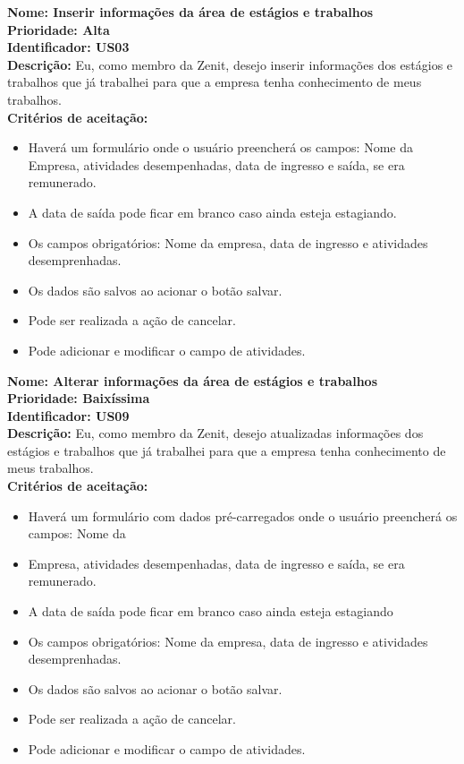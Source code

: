 \begin{anexosenv}
\textbf{Nome: Inserir informações da área de estágios e trabalhos\\
    Prioridade: Alta\\
    Identificador: US03\\
    Descrição:} Eu, como membro da Zenit, desejo inserir informações dos estágios e trabalhos que já trabalhei para que a empresa tenha conhecimento de meus trabalhos.\\
\textbf{Critérios de aceitação:}
\begin{itemize}
    \item Haverá um formulário onde o usuário preencherá os campos: Nome da Empresa, atividades desempenhadas, data de ingresso e saída, se era remunerado.
    \item A data de saída pode ficar em branco caso ainda esteja estagiando.
    \item Os campos obrigatórios: Nome da empresa, data de ingresso e atividades desemprenhadas.
    \item Os dados são salvos ao acionar o botão salvar.
    \item Pode ser realizada a ação de cancelar.
    \item Pode adicionar e modificar o campo de atividades.
\end{itemize}

\textbf{Nome: Alterar informações da área de estágios e trabalhos\\
    Prioridade: Baixíssima\\
    Identificador: US09\\
    Descrição:} Eu, como membro da Zenit, desejo atualizadas informações dos estágios e trabalhos que já trabalhei para que a empresa tenha conhecimento de meus trabalhos.\\
\textbf{Critérios de aceitação:}
\begin{itemize}
    \item Haverá um formulário com dados pré-carregados onde o usuário preencherá os campos: Nome da \item Empresa, atividades desempenhadas, data de ingresso e saída, se era remunerado.
    \item A data de saída pode ficar em branco caso ainda esteja estagiando
    \item Os campos obrigatórios: Nome da empresa, data de ingresso e atividades desemprenhadas.
    \item Os dados são salvos ao acionar o botão salvar.
    \item Pode ser realizada a ação de cancelar.
    \item Pode adicionar e modificar o campo de atividades.
\end{itemize}


\end{anexosenv}
